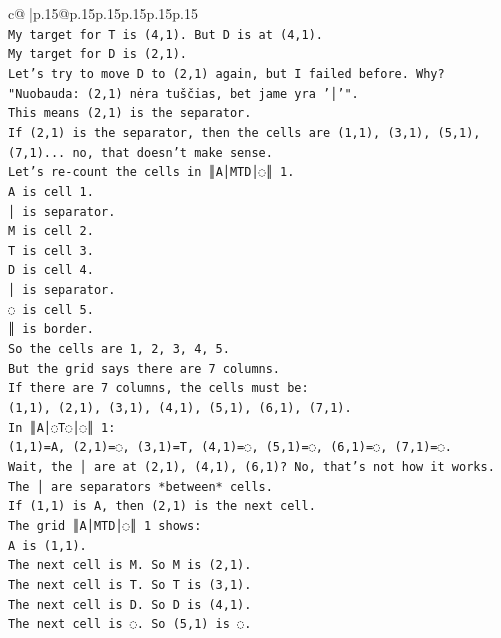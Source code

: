 \documentclass{article}
\begin{document}
{\begin{supertabular}{c@{$\;$}|p{.15\linewidth}@{}p{.15\linewidth}p{.15\linewidth}p{.15\linewidth}p{.15\linewidth}p{.15\linewidth}}
{{{\\ 
\texttt{My target for T is (4,1). But D is at (4,1).} \\
\texttt{My target for D is (2,1).} \\
\texttt{Let's try to move D to (2,1) again, but I failed before. Why?} \\
\texttt{"Nuobauda: (2,1) nėra tuščias, bet jame yra '│'".} \\
\texttt{This means (2,1) is the separator.} \\
\texttt{If (2,1) is the separator, then the cells are (1,1), (3,1), (5,1), (7,1)... no, that doesn't make sense.} \\
\texttt{Let's re{-}count the cells in ║A│MTD│◌║ 1.} \\
\texttt{A is cell 1.} \\
\texttt{│ is separator.} \\
\texttt{M is cell 2.} \\
\texttt{T is cell 3.} \\
\texttt{D is cell 4.} \\
\texttt{│ is separator.} \\
\texttt{◌ is cell 5.} \\
\texttt{║ is border.} \\
\texttt{So the cells are 1, 2, 3, 4, 5.} \\
\texttt{But the grid says there are 7 columns.} \\
\texttt{If there are 7 columns, the cells must be:} \\
\texttt{(1,1), (2,1), (3,1), (4,1), (5,1), (6,1), (7,1).} \\
\texttt{In ║A│◌T◌│◌║ 1:} \\
\texttt{(1,1)=A, (2,1)=◌, (3,1)=T, (4,1)=◌, (5,1)=◌, (6,1)=◌, (7,1)=◌.} \\
\texttt{Wait, the │ are at (2,1), (4,1), (6,1)? No, that's not how it works.} \\
\texttt{The │ are separators *between* cells.} \\
\texttt{If (1,1) is A, then (2,1) is the next cell.} \\
\texttt{The grid ║A│MTD│◌║ 1 shows:} \\
\texttt{A is (1,1).} \\
\texttt{The next cell is M. So M is (2,1).} \\
\texttt{The next cell is T. So T is (3,1).} \\
\texttt{The next cell is D. So D is (4,1).} \\
\texttt{The next cell is ◌. So (5,1) is ◌.} \\
}}}
\end{supertabular}}
\end{document}
